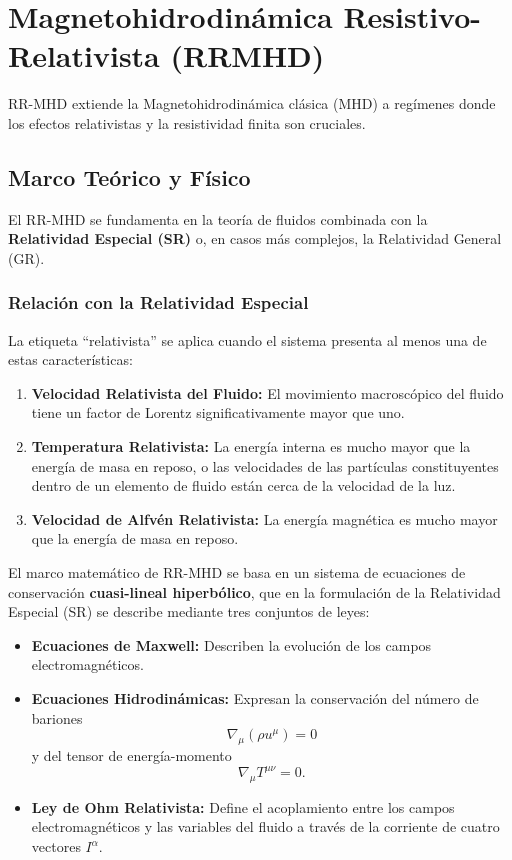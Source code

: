 \section{Magnetohidrodinámica Resistivo-Relativista (RRMHD)}


RR-MHD extiende la Magnetohidrodinámica clásica (MHD) a regímenes donde los efectos relativistas y la resistividad finita son cruciales.

\subsection{Marco Teórico y Físico}

El RR-MHD se fundamenta en la teoría de fluidos combinada con la \textbf{Relatividad Especial (SR)} o, en casos más complejos, la Relatividad General (GR).

\subsubsection{Relación con la Relatividad Especial}

La etiqueta ``relativista'' se aplica cuando el sistema presenta al menos una de estas características:

\begin{enumerate}
    \item \textbf{Velocidad Relativista del Fluido:} El movimiento macroscópico del fluido tiene un factor de Lorentz significativamente mayor que uno.
    \item \textbf{Temperatura Relativista:} La energía interna es mucho mayor que la energía de masa en reposo, o las velocidades de las partículas constituyentes dentro de un elemento de fluido están cerca de la velocidad de la luz.
    \item \textbf{Velocidad de Alfvén Relativista:} La energía magnética es mucho mayor que la energía de masa en reposo.
\end{enumerate}

El marco matemático de RR-MHD se basa en un sistema de ecuaciones de conservación \textbf{cuasi-lineal hiperbólico}, que en la formulación de la Relatividad Especial (SR) se describe mediante tres conjuntos de leyes:

\begin{itemize}
    \item \textbf{Ecuaciones de Maxwell:} Describen la evolución de los campos electromagnéticos.
    \item \textbf{Ecuaciones Hidrodinámicas:} Expresan la conservación del número de bariones 
    \begin{equation}
        \nabla_\mu (\rho u^\mu) = 0
    \end{equation}
    y del tensor de energía-momento
    \begin{equation}
        \nabla_\mu T^{\mu\nu} = 0.
    \end{equation}
    \item \textbf{Ley de Ohm Relativista:} Define el acoplamiento entre los campos electromagnéticos y las variables del fluido a través de la corriente de cuatro vectores $I^\alpha$.
\end{itemize}


